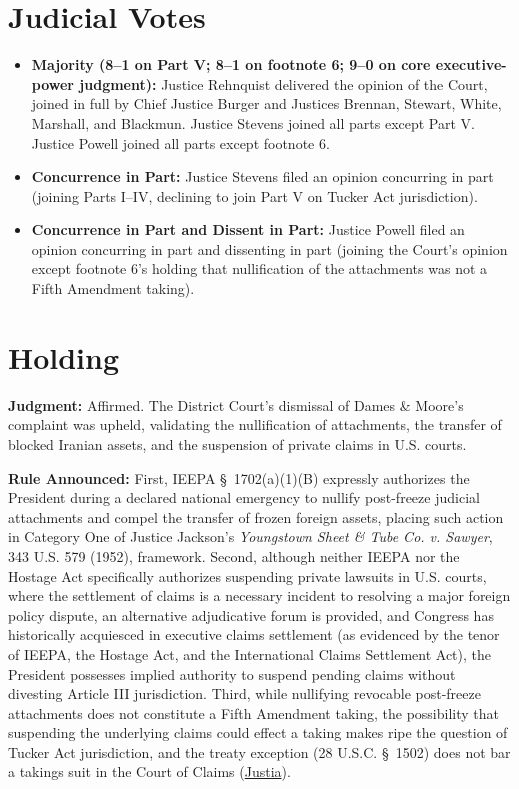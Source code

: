 \documentclass[12pt]{article}
\begin{document}
\section{Judicial Votes}
\begin{itemize}
  \item \textbf{Majority (8--1 on Part V; 8--1 on footnote 6; 9--0 on core executive-power judgment):} Justice Rehnquist delivered the opinion of the Court, joined in full by Chief Justice Burger and Justices Brennan, Stewart, White, Marshall, and Blackmun. Justice Stevens joined all parts except Part V. Justice Powell joined all parts except footnote 6.
  \item \textbf{Concurrence in Part:} Justice Stevens filed an opinion concurring in part (joining Parts I--IV, declining to join Part V on Tucker Act jurisdiction).
  \item \textbf{Concurrence in Part and Dissent in Part:} Justice Powell filed an opinion concurring in part and dissenting in part (joining the Court's opinion except footnote 6's holding that nullification of the attachments was not a Fifth Amendment taking).
\end{itemize}

\section{Holding}
\textbf{Judgment:} Affirmed. The District Court's dismissal of Dames \& Moore's complaint was upheld, validating the nullification of attachments, the transfer of blocked Iranian assets, and the suspension of private claims in U.S. courts.

\textbf{Rule Announced:} First, IEEPA \S\ 1702(a)(1)(B) expressly authorizes the President during a declared national emergency to nullify post-freeze judicial attachments and compel the transfer of frozen foreign assets, placing such action in Category One of Justice Jackson's \textit{Youngstown Sheet \& Tube Co. v. Sawyer}, 343 U.S. 579 (1952), framework. Second, although neither IEEPA nor the Hostage Act specifically authorizes suspending private lawsuits in U.S. courts, where the settlement of claims is a necessary incident to resolving a major foreign policy dispute, an alternative adjudicative forum is provided, and Congress has historically acquiesced in executive claims settlement (as evidenced by the tenor of IEEPA, the Hostage Act, and the International Claims Settlement Act), the President possesses implied authority to suspend pending claims without divesting Article III jurisdiction. Third, while nullifying revocable post-freeze attachments does not constitute a Fifth Amendment taking, the possibility that suspending the underlying claims could effect a taking makes ripe the question of Tucker Act jurisdiction, and the treaty exception (28 U.S.C. \S\ 1502) does not bar a takings suit in the Court of Claims (\href{https://supreme.justia.com/cases/federal/us/453/654/}{Justia}).
\end{document}
